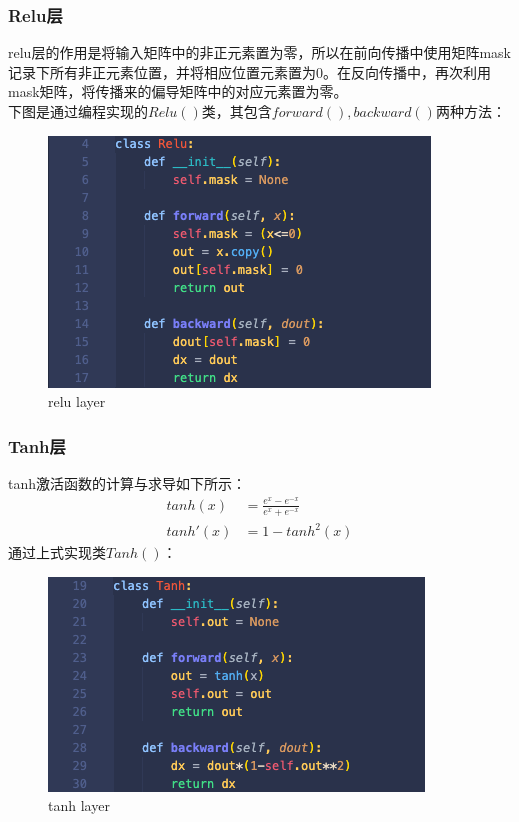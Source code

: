 \documentclass{article}
\begin{document}
\subsubsection{Relu层}
relu层的作用是将输入矩阵中的非正元素置为零，所以在前向传播中使用矩阵mask记录下所有非正元素位置，并将相应位置元素置为0。在反向传播中，再次利用mask矩阵，将传播来的偏导矩阵中的对应元素置为零。\\
下图是通过编程实现的$ Relu() $类，其包含$ forward(),backward() $两种方法：
\begin{figure}[H]
	\centering
	\includegraphics{relulayer.png}
	\caption{relu layer}
\end{figure}

\subsubsection{Tanh层}
tanh激活函数的计算与求导如下所示：\\
\begin{equation}
\begin{aligned}
	tanh(x) &= \frac{e^{x}-e^{-x}}{e^{x}+e^{-x}}\\
	tanh'(x) &= 1 - tanh^2(x)
\end{aligned}
\end{equation}
通过上式实现类$ Tanh() $：
\begin{figure}[H]
	\centering
	\includegraphics{tanhlayer.png}
	\caption{tanh layer}
\end{figure}
\end{document}
